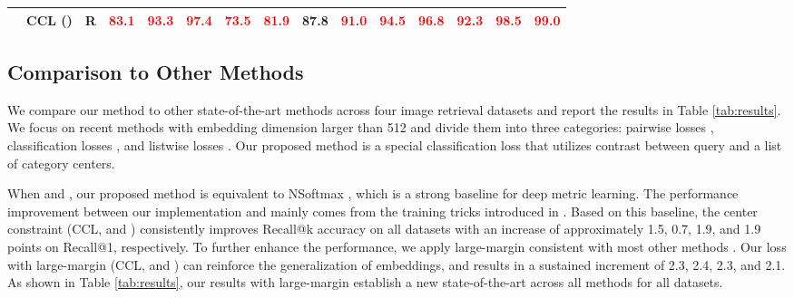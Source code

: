 \documentclass[10pt,twocolumn,letterpaper]{article}
\begin{document}
\begin{table*}[ht]
\begin{tabular}{c|l|l|ccc|ccc|ccc|ccc}
    &CCL ()                    &R &\textcolor{red}{\textbf{83.1}}&\textcolor{red}{\textbf{93.3}}&\textcolor{red}{\textbf{97.4}}&\textcolor{red}{\textbf{73.5}}&\textcolor{red}{\textbf{81.9}}&87.8&\textcolor{red}{\textbf{91.0}}&\textcolor{red}{\textbf{94.5}}&\textcolor{red}{\textbf{96.8}}&\textcolor{red}{\textbf{92.3}}&\textcolor{red}{\textbf{98.5}}&\textcolor{red}{\textbf{99.0}}\\
\hline   
\end{tabular}
\caption{Comparison with the state-of-the-art methods. Backbone architecture (Arch.) with superscripts denoting embedding sizes are denoted by abbreviations: I -- Inception \cite{inception}, R -- ResNet50 \cite{resnet}.  indicates models using larger input images, and ``CCL" indicates our loss with large-margin. The \textcolor{red}{\textbf{blod}} indicates the best value while \textcolor{blue}{\underline{underline}} indicates the second best.}
\label{tab:results}
\end{table*}

\subsection{Comparison to Other Methods}

We compare our method to other state-of-the-art methods across four image retrieval datasets and report the results in Table \ref{tab:results}. We focus on recent methods with embedding dimension larger than 512 and divide them into three categories: pairwise losses \cite{sh,htl,ms,circleloss,xbm,horde,sct}, classification losses \cite{ce,nsoftmax,proxynca,cosface,arcface,proxygml,softtriple,proxynca_pp,proxyanchor,metrix}, and listwise losses \cite{rll,fastap,blackbox,smoothap,softbin,rsk,roadmap}. Our proposed method is a special classification loss that utilizes contrast between query and a list of category centers.

When  and , our proposed method is equivalent to NSoftmax \cite{nsoftmax}, which is a strong baseline for deep metric learning. The performance improvement between our implementation and \cite{nsoftmax} mainly comes from the training tricks introduced in \cite{ce}. Based on this baseline, the center constraint (CCL,  and ) consistently improves Recall@k accuracy on all datasets with an increase of approximately 1.5, 0.7, 1.9, and 1.9 points on Recall@1, respectively. To further enhance the performance, we apply large-margin consistent with most other methods \cite{horde,proxyanchor,rll,roadmap}. Our loss with large-margin (CCL,  and ) can reinforce the generalization of embeddings, and results in a sustained increment of 2.3, 2.4, 2.3, and 2.1. As shown in Table \ref{tab:results}, our results with large-margin establish a new state-of-the-art across all methods for all datasets.
\end{document}
